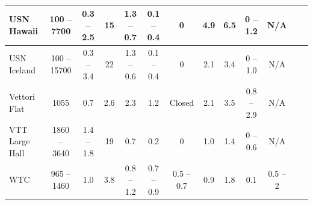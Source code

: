 \begin{table}
\begin{center}
\begin{tabular}{|l|c|c|c|c|c|c|c|c|c|c|c|c|}
USN Hawaii          & 100 -- 7700   & 0.3 -- 2.5    & 15    & 1.3 -- 0.7        & 0.1 -- 0.4    & 0             & 4.9       & 6.5       & 0 -- 1.2          & N/A               \\ \hline
USN Iceland         & 100 -- 15700  & 0.3 -- 3.4    & 22    & 1.3 -- 0.6        & 0.1 -- 0.4    & 0             & 2.1       & 3.4       & 0 -- 1.0          & N/A               \\ \hline
Vettori Flat        & 1055          & 0.7           & 2.6   & 2.3               & 1.2           & Closed        & 2.1       & 3.5       & 0.8 -- 2.9        & N/A               \\ \hline
VTT Large Hall      & 1860 -- 3640  & 1.4 -- 1.8    & 19    & 0.7               & 0.2           & 0             & 1.0       & 1.4       & 0 -- 0.6          & N/A               \\ \hline
WTC                 & 965 -- 1460   & 1.0           & 3.8   & 0.8 -- 1.2        & 0.7 -- 0.9    & 0.5 -- 0.7    & 0.9       & 1.8       & 0.1               & 0.5 -- 2          \\ \hline
\end{tabular}
\end{center}
\label{Test_Parameters}
\nopagebreak
\end{table}


\noindent